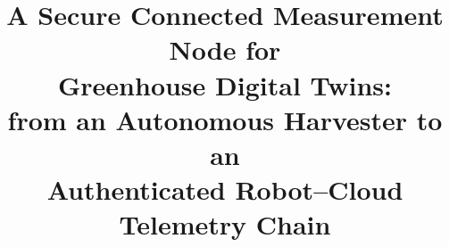 \documentclass[conference]{IEEEtran}
\begin{document}
\title{A Secure Connected Measurement Node for\\
       Greenhouse Digital Twins:\\
       from an Autonomous Harvester to an\\
       Authenticated Robot--Cloud Telemetry Chain}

\author{%
}

\maketitle
\end{document}
